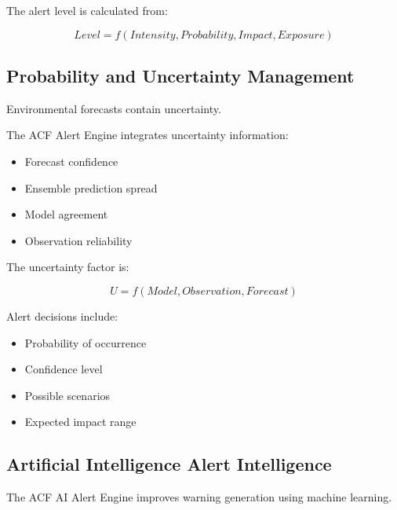 The alert level is calculated from:

\[
Level=
f(Intensity,Probability,Impact,Exposure)
\]



\subsection{Probability and Uncertainty Management}

Environmental forecasts contain uncertainty.

The ACF Alert Engine integrates uncertainty information:

\begin{itemize}

\item Forecast confidence

\item Ensemble prediction spread

\item Model agreement

\item Observation reliability

\end{itemize}


The uncertainty factor is:

\[
U=
f(Model,Observation,Forecast)
\]


Alert decisions include:

\begin{itemize}

\item Probability of occurrence

\item Confidence level

\item Possible scenarios

\item Expected impact range

\end{itemize}



\subsection{Artificial Intelligence Alert Intelligence}

The ACF AI Alert Engine improves warning generation using machine
learning.

